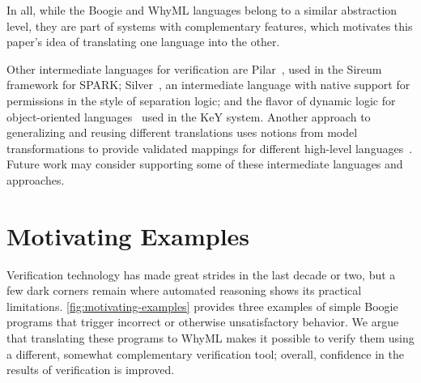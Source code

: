 \documentclass[a4paper,final]{llncs}
\newif\iflong
\newcommand{\Boogie}{Boogie\xspace}
\newcommand{\WhyML}{WhyML\xspace}
\newcommand{\Why}{Why3\xspace}
\begin{document}
\iflong
Another element that differentiates \Boogie and \Why is the support for executing programs; this is quite useful for debugging verification attempts and for applying testing-like techniques to the realm of verification.
Boogaloo~\cite{PFW-RV13} supports symbolic execution of \Boogie programs; Symbooglix is a more recent project with the same goal~\cite{symbooglix}. 
Thanks to it being a member of the ML family, \Why directly supports symbolic execution as well as compilation of \WhyML programs to OCaml.
\fi

In all, while the \Boogie and \WhyML languages belong to a similar abstraction level, they are part of systems with complementary features, which motivates this paper's idea of translating one language into the other.
\iflong
Since \Boogie is overall more popular, in terms of tools that use it as a back-end, the translation from \Boogie to \WhyML is more practically useful than the one in the opposite direction.
\fi

Other intermediate languages for verification are Pilar~\cite{Pilar-VSTTE}, used in the Sireum framework for SPARK; Silver~\cite{HeuleKMS13}, an intermediate language with native support for permissions in the style of separation logic; and the flavor of dynamic logic for object-oriented languages~\cite{SchmittUW10} used in the KeY system.
Another approach to generalizing and reusing different translations uses notions from model transformations to provide validated mappings for different high-level languages~\cite{ChengMP15}.
Future work may consider supporting some of these intermediate languages and approaches.








\section{Motivating Examples}\label{sec:examples}

Verification technology has made great strides in the last decade or two, but a few dark corners remain where automated reasoning shows its practical limitations.
\autoref{fig:motivating-examples} provides three examples of simple \Boogie programs that trigger incorrect or otherwise unsatisfactory behavior. We argue that translating these programs to \WhyML makes it possible to verify them using a different, somewhat complementary verification tool; overall, confidence in the results of verification is improved.
\end{document}

